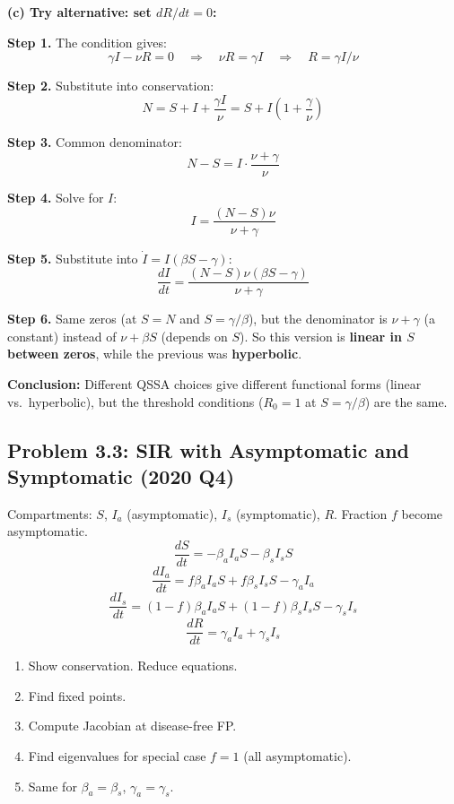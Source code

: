 \documentclass[10pt]{article}
\newcommand{\thus}{\quad\Longrightarrow\quad}
\begin{document}
\begin{solution}
\medskip\textbf{(c) Try alternative: set $dR/dt = 0$:}

\textbf{Step 1.} The condition gives:
\[
\gamma I - \nu R = 0 \thus \nu R = \gamma I \thus R = \gamma I/\nu
\]

\textbf{Step 2.} Substitute into conservation:
\[
N = S + I + \frac{\gamma I}{\nu} = S + I\left(1 + \frac{\gamma}{\nu}\right)
\]

\textbf{Step 3.} Common denominator:
\[
N - S = I\cdot\frac{\nu + \gamma}{\nu}
\]

\textbf{Step 4.} Solve for $I$:
\[
I = \frac{(N-S)\nu}{\nu + \gamma}
\]

\textbf{Step 5.} Substitute into $\dot I = I(\beta S - \gamma)$:
\[
\frac{dI}{dt} = \frac{(N-S)\nu(\beta S - \gamma)}{\nu + \gamma}
\]

\textbf{Step 6.} Same zeros (at $S = N$ and $S = \gamma/\beta$), but the denominator is $\nu + \gamma$ (a constant) instead of $\nu + \beta S$ (depends on $S$). So this version is \textbf{linear in $S$ between zeros}, while the previous was \textbf{hyperbolic}.

\textbf{Conclusion:} Different QSSA choices give different functional forms (linear vs.\ hyperbolic), but the threshold conditions ($R_0 = 1$ at $S = \gamma/\beta$) are the same.
\end{solution}

\subsection{Problem 3.3: SIR with Asymptomatic and Symptomatic (2020 Q4)}

\begin{problem}
Compartments: $S$, $I_a$ (asymptomatic), $I_s$ (symptomatic), $R$. Fraction $f$ become asymptomatic.
\[
\frac{dS}{dt} = -\beta_a I_a S - \beta_s I_s S
\]
\[
\frac{dI_a}{dt} = f\beta_a I_a S + f\beta_s I_s S - \gamma_a I_a
\]
\[
\frac{dI_s}{dt} = (1-f)\beta_a I_a S + (1-f)\beta_s I_s S - \gamma_s I_s
\]
\[
\frac{dR}{dt} = \gamma_a I_a + \gamma_s I_s
\]
\begin{enumerate}[label=(\alph*)]
\item Show conservation. Reduce equations.
\item Find fixed points.
\item Compute Jacobian at disease-free FP.
\item Find eigenvalues for special case $f = 1$ (all asymptomatic).
\item Same for $\beta_a = \beta_s$, $\gamma_a = \gamma_s$.
\end{enumerate}
\end{problem}
\end{document}
